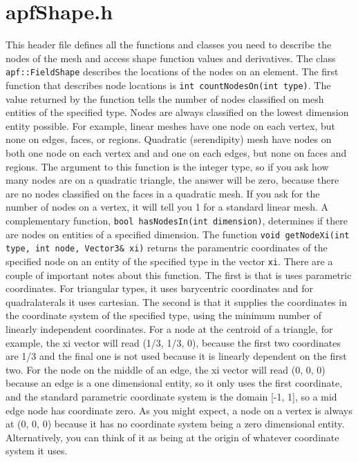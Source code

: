 \documentclass[12pt]{article}
\newcommand{\ttt}{\texttt}
\begin{document}
\section{apfShape.h}
This header file defines all the functions and classes you need to describe the nodes of the mesh and access shape function values and derivatives.
The class \ttt{apf::FieldShape} describes the locations of the nodes on an element.
The first function that describes node locations is 
\newline
\newline
\noindent\ttt{int countNodesOn(int type)}.
\newline
\newline
The value returned by the function tells the number of nodes classified on mesh entities of the specified type.  Nodes are always classified on the lowest dimension entity possible.  
For example, linear meshes have one node on each vertex, but none on edges, faces, or regions.  
Quadratic (serendipity) mesh have nodes on both one node on each vertex and and one on each edges, but none on faces and regions.  
The argument to this function is the integer type, so if you ask how many nodes are on a quadratic triangle, the answer will be zero, because there are no nodes classified on the faces in a quadratic mesh.  
If you ask for the number of nodes on a vertex, it will tell you 1 for a standard linear mesh.
A complementary function,
\newline
\newline
\noindent\ttt{bool hasNodesIn(int dimension)},
\newline
\newline
determines if there are nodes on entities of a specified dimension.
The function 
\newline
\newline
\noindent\ttt{void getNodeXi(int type, int node, Vector3\& xi)}
\newline
\newline
returns the paramentric coordinates of the specified node on an entity of the specified type in the vector \ttt{xi}.  
There are a couple of important notes about this function.  The first is that is uses parametric coordinates.  For triangular types, it uses barycentric coordinates and for quadralaterals it uses cartesian.  
The second is that it supplies the coordinates in the coordinate system of the specified type, using the minimum number of linearly independent coordinates.
For a node at the centroid of a triangle, for example, the xi vector will read (1/3, 1/3, 0), because the first two coordinates are 1/3 and the final one is not used because it is linearly dependent on the first two.
For the node on the middle of an edge, the xi vector will read (0, 0, 0) because an edge is a one dimensional entity, so it only uses the first coordinate, and the standard parametric coordinate system is the domain [-1, 1], so a mid edge node has coordinate zero.
As you might expect, a node on a vertex is always at (0, 0, 0) because it has no coordinate system being a zero dimensional entity.  
Alternatively, you can think of it as being at the origin of whatever coordinate system it uses.
\end{document}

